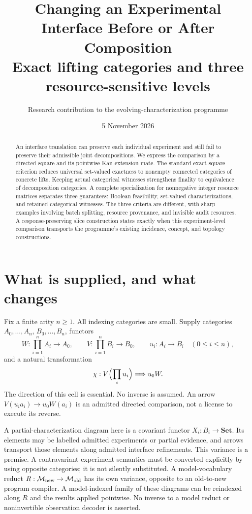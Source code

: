\documentclass[11pt]{article}
\title{Changing an Experimental Interface Before or After Composition\\\large Exact lifting categories and three resource-sensitive levels}
\author{Research contribution to the evolving-characterization programme}
\date{5 November 2026}
\theoremstyle{definition}\newtheorem{definition}[theorem]{Definition}
\theoremstyle{remark}\newtheorem{remark}[theorem]{Remark}
\newcommand{\Set}{\mathbf{Set}}
\begin{document}
\maketitle
\begin{abstract}
An interface translation can preserve each individual experiment and still
fail to preserve their admissible joint decompositions. We express the
comparison by a directed square and its pointwise Kan-extension mate.
The standard exact-square criterion reduces universal set-valued exactness
to nonempty connected categories of concrete lifts. Keeping actual
categorical witnesses strengthens finality to equivalence of decomposition
categories. A complete specialization for nonnegative integer resource
matrices separates three guarantees: Boolean feasibility, set-valued
characterizations, and retained categorical witnesses. The three criteria
are different, with sharp examples involving batch splitting, resource
provenance, and invisible audit resources. A response-preserving slice
construction states exactly when this experiment-level comparison transports
the programme's existing incidence, concept, and topology constructions.
\end{abstract}

\section{What is supplied, and what changes}
Fix a finite arity $n\geq1$. All indexing categories are small. Supply
categories $A_0,\ldots,A_n$, $B_0,\ldots,B_n$, functors
\[
 W:\prod_{i=1}^n A_i\longrightarrow A_0,\qquad
 V:\prod_{i=1}^n B_i\longrightarrow B_0,
 \qquad u_i:A_i\longrightarrow B_i\quad(0\leq i\leq n),
\]
and a natural transformation
\begin{equation}\label{eq:cell}
 \chi:V\Bigl(\prod_i u_i\Bigr)\Longrightarrow u_0W.
\end{equation}
The direction of this cell is essential. No inverse is assumed.
An arrow $V(u_i a_i)\to u_0W(a_i)$ is an admitted directed comparison,
not a license to execute its reverse.

A partial-characterization diagram here is a covariant functor
$X_i:B_i\to\Set$. Its elements may be labelled admitted experiments or
partial evidence, and arrows transport those elements along admitted
interface refinements. This variance is a premise. A contravariant
experiment semantics must be converted explicitly by using opposite
categories; it is not silently substituted. A model-vocabulary reduct
$R:\mathcal M_{\rm new}\to\mathcal M_{\rm old}$ has its own variance,
opposite to an old-to-new program compiler. A model-indexed family of
these diagrams can be reindexed along $R$ and the results applied pointwise.
No inverse to a model reduct or noninvertible observation decoder is
asserted.
\end{document}
